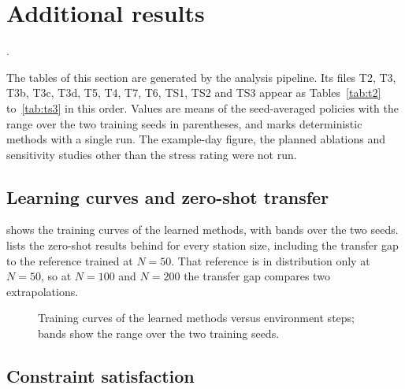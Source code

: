 \section{Additional results}\label{sec:results-supp}

.

The tables of this section are generated by the analysis pipeline.
Its files T2, T3, T3b, T3c, T3d, T5, T4, T7, T6, TS1, TS2 and TS3 appear as Tables~\ref{tab:t2} to~\ref{tab:ts3} in this order.
Values are means of the seed-averaged policies with the range over the two training seeds in parentheses, and \dag{} marks deterministic methods with a single run.
The example-day figure, the planned ablations and sensitivity studies other than the stress rating were not run.

\subsection{Learning curves and zero-shot transfer}\label{app:res-tables}

 shows the training curves of the learned methods, with bands over the two seeds.
 lists the zero-shot results behind  for every station size, including the transfer gap to the reference trained at $N=50$.
That reference is in distribution only at $N=50$, so at $N=100$ and $N=200$ the transfer gap compares two extrapolations.

\begin{figure}[t]
\centering
{}
\caption{Training curves of the learned methods versus environment steps; bands show the range over the two training seeds.}
\label{fig:curves}
\end{figure}


\subsection{Constraint satisfaction}\label{app:res-constraints}


